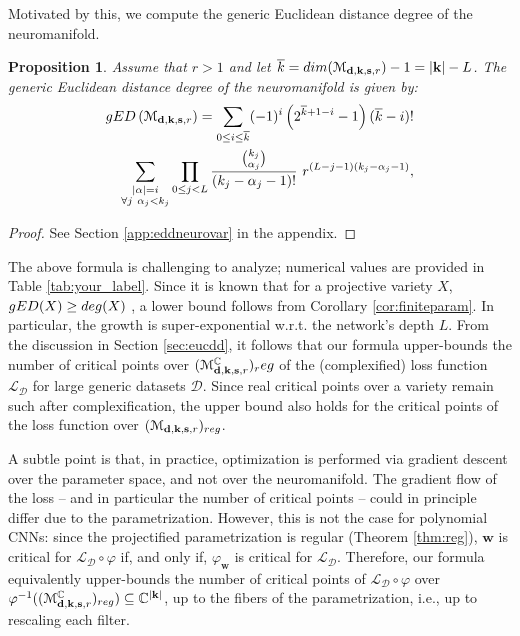 \documentclass[twoside]{article}
\theoremstyle{plain}%
\newtheorem{prop}[thm]{Proposition}
\theoremstyle{definition}
\theoremstyle{remark}
\newcommand{\edd}{\textnormal{gED}}
\begin{document}
Motivated by this, we compute the generic Euclidean distance degree of the neuromanifold. 
\begin{prop}\label{prop:eddneurovar}
    Assume that $r > 1$ and let $\overline{k} = \textnormal{dim}(\mathcal{M}_{\mathbf{d}, \mathbf{k}, \mathbf{s}, r} )-1 = |\mathbf{k}| - L$. The generic Euclidean distance degree of the neuromanifold is given by: 
    \begin{align*}
         \edd\left(\mathcal{M}_{\mathbf{d}, \mathbf{k}, \mathbf{s}, r} \right) = \sum_{0 \leq i \leq\overline{k} } (-1)^i \left( 2^{\overline{k}  + 1 - i} - 1 \right)(\overline{k}  - i)!  \\ \sum_{\substack{|\mathbf{\alpha}|=i \\ \forall j \  \alpha_j < k_j}}  
         \prod_{0 \leq j < L} \frac{\binom{k_j}{\alpha_j}}{(k_j - \alpha_j - 1)!} \ r^{(L - j -1)(k_j - \alpha_j - 1)},
    \end{align*}
\end{prop}
\begin{proof}
See Section \ref{app:eddneurovar} in the appendix. 
\end{proof}
The above formula is challenging to analyze; numerical values are provided in Table \ref{tab:your_label}. Since it is known that for a projective variety $X$, $\textnormal{gED}(X) \geq \textnormal{deg}(X)$ \parencite[Theorem 5.4]{draisma2016euclidean}, a lower bound follows from  Corollary \ref{cor:finiteparam}. In particular, the growth is super-exponential w.r.t. the network's depth $L$. From the discussion in Section \ref{sec:eucdd},  
it follows that our formula upper-bounds the number of critical points over $(\mathcal{M}_{\mathbf{d}, \mathbf{k}, \mathbf{s}, r}^\mathbb{C})_\textnormal{reg}$ of the (complexified) loss function $\mathcal{L}_ \mathcal{D}$ for large generic datasets $\mathcal{D}$. Since real critical points over a variety remain such after complexification, the upper bound also holds for the critical points of the loss function over $(\mathcal{M}_{\mathbf{d}, \mathbf{k}, \mathbf{s}, r})_{\textnormal{reg}}$. 

A subtle point is that, in practice, optimization is performed via gradient descent over the parameter space, and not over the neuromanifold. The gradient flow of the loss -- and in particular the number of critical points -- could in principle differ due to the parametrization. However, this is not the case for polynomial CNNs: since the projectified parametrization is regular (Theorem \ref{thm:reg}), $\mathbf{w}$ is critical for $\mathcal{L}_{\mathcal{D}} \circ \varphi$ if, and only if, $\varphi_\mathbf{w}$ is critical for $\mathcal{L}_{\mathcal{D}}$. Therefore, our formula equivalently upper-bounds the number of critical points of $\mathcal{L}_\mathcal{D} \circ \varphi$ over $\varphi^{-1}((\mathcal{M}_{\mathbf{d}, \mathbf{k}, \mathbf{s}, r}^\mathbb{C})_{\textnormal{reg}}) \subseteq \mathbb{C}^{|\mathbf{k}|}$, up to the fibers of the parametrization, i.e., up to rescaling each filter. 
\end{document}
